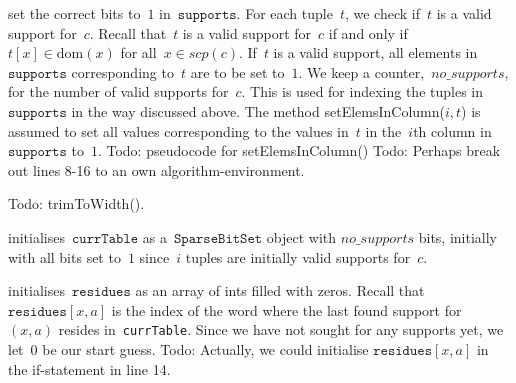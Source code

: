 \documentclass[a4paper,11pt]{article}
\newcommand{\Todo}[1]{{\color{blue}Todo: #1}}
\newcommand{\Dom}[1]{\text{dom}({#1})}
\newcommand{\SparseBitSet}{\texttt{SparseBitSet}}
\newcommand{\CurrTable}{\texttt{currTable}}
\newcommand{\Supports}{\texttt{supports}}
\newcommand{\Residues}{\texttt{residues}}
\begin{document}
 set the correct bits to~$1$ in~$\Supports$.
For each tuple~$t$, we check if~$t$ is a valid support for~$c$. Recall that~$t$ is
a valid support for~$c$ if and only if~$t[x] \in \Dom{x}$ for all~$x \in scp(c)$.
If~$t$ is a valid support,
all elements in~$\Supports$ corresponding to~$t$ are to be set to~$1$.
We keep a counter,~$no\_supports$, for the number of valid supports for~$c$.
This is used for indexing the tuples in~$\Supports$ in the way discussed above.
The method setElemsInColumn($i,t$) is assumed to set all values corresponding to
the values in~$t$ in the~$i$th column in~$\Supports$ to~$1$. 
\Todo{pseudocode for setElemsInColumn()}
\Todo{Perhaps break out lines 8-16 to an own algorithm-environment.}

\Todo{trimToWidth()}.

 initialises~$\CurrTable$ as a~$\SparseBitSet$ object with
$no\_supports$ bits, initially with all bits set to~$1$ since~$i$ tuples are initially
valid supports for~$c$.

 initialises~$\Residues$ as an array of ints filled with zeros.
Recall that~$\Residues[x,a]$ is the index of the word where the last found
support for~$(x,a)$ resides in~\CurrTable. Since we have not sought for any supports yet,
we let~$0$ be our start guess.
\Todo{Actually, we could initialise $\Residues[x,a]$ in the if-statement in line 14.}\\
\end{document}

